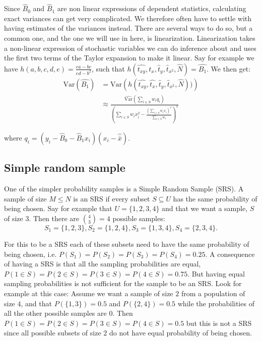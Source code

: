 \documentclass{article}
\begin{document}
Since \(\hat{B}_0\) and \(\hat{B}_1\) are non linear expressions of dependent
statistics, calculating exact variances can get very complicated. We therefore
often have to settle with having estimates of the variances instead.
There are several ways to do so, but a common one,
and the one we will use in here, is linearization. Linearization takes a
non-linear expression of stochastic variables we can do inference about and uses
the first two terms of the Taylor expansion to make it linear.
Say for example we have \(h(a, b, c, d, e) = \frac{ea - bc}{ed - b^2}\), such that
\(h(\hat{t_{xy}}, \hat{t_x}, \hat{t}_y, \hat{t}_{x^2}, \hat{N}) = \hat{B_1}\).
We then get:
\begin{align*}
  \mathrm{Var}(\hat{B_1})
  &= \mathrm{Var} \left( h(\hat{t_{xy}}, \hat{t_x},
  \hat{t}_y, \hat{t}_{x^2}, \hat{N})) \right) \\
  &\approx \frac{\widehat{\mathrm{Var}}\left( \sum_{i \in S} w_i q_i \right)}
    {\left( \sum_{i \in S} w_i x_i^2 - \frac{\left( \sum_{i \in S} w_i x_i \right)^2}{\sum_{i \in S} w_i} \right)^2}
\end{align*}

where \(q_i = (y_i - \hat{B}_0 - \hat{B}_1 x_i)(x_i - \hat{\bar{x}})\).

\subsection{Simple random sample}

One of the simpler probability samples is a Simple Random Sample (SRS). A
sample of size \(M \leq N\) is an SRS if every subset \(S \subseteq U\) has the same
probability of being chosen.
Say for example that \(U = \{1, 2, 3, 4\}\) and that we want a sample, \(S\) of
size \(3\). Then there are \(\binom{4}{3} = 4\)  possible samples:
\begin{equation*}
 S_1 = \{1, 2, 3\}, 
 S_2 = \{1, 2, 4\}, 
 S_3 = \{1, 3, 4\}, 
 S_4 = \{2, 3, 4\} .
 \end{equation*}


For this to be a SRS each of these subsets need to have the same probability of
being chosen, i.e. \(P(S_1) = P(S_2) = P(S_3) = P(S_4) = 0.25\). A consequence of
having a SRS is that all the sampling probabilities are equal, \(P(1 \in S) =
P(2 \in S) = P(3 \in S) = P(4 \in S) = 0.75\). But having equal sampling
probabilities is not sufficient for the sample to be an SRS.
Look for example at this case:
Assume we want a sample of size \(2\) from a population of size \(4\), and that
\(P(\{1, 3\}) = 0.5\) and \(P(\{2, 4\}) = 0.5\) while the probabilities of all the
other possible samples are \(0\). Then \(P(1 \in S) = P(2 \in S) = P(3 \in S) = P(4 \in S) = 0.5\)
but this is not a SRS since all possible subsets of size \(2\) do not have equal
probability of being chosen.
\end{document}
